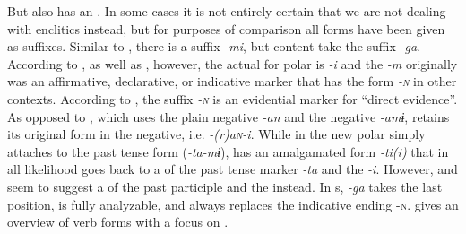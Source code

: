 \noindent But  also has an  . In some cases it is not entirely certain that we are not dealing with enclitics instead, but for purposes of comparison all forms have been given as suffixes. Similar to , there is a  suffix \textit{-mi}, but content  take the suffix \textit{-ga}. According to \citet[95]{Uemura2003}, as well as \citep[181f.]{Arakaki2003}, however, the actual  for polar  is \textit{-i} and the \textit{-m} originally was an affirmative, declarative, or indicative marker that has the form \textit{-\textsc{n}} in other contexts. According to \citet{Arakaki2010}, the suffix \textit{-\textsc{n}} is an evidential marker for “direct evidence”. As opposed to , which uses the plain negative \textit{-an} and the  negative \textit{-amɨ},  retains its original form in the negative, i.e. \textit{-(r)a\textsc{n}-i}. While in  the new polar  simply attaches to the past tense form (\textit{-ta-mɨ}),  has an amalgamated form \textit{-ti(i)} that in all likelihood goes back to a  of the past tense marker \textit{-ta} and the  \textit{-i}. However, \citet[145]{Uemura2003} and \citet[67]{Arakaki2015} seem to suggest a  of the past participle and the  instead. In s, \textit{-ga} takes the last position, is fully analyzable, and always replaces the indicative ending \textsc{-n}.  gives an overview of  verb forms with a focus on  .


